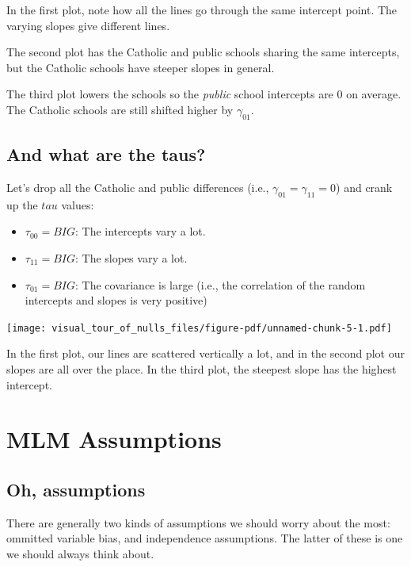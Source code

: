 \documentclass[
  letterpaper,
  DIV=11,
  numbers=noendperiod]{scrreprt}
\providecommand{\tightlist}{%
  \setlength{\itemsep}{0pt}\setlength{\parskip}{0pt}}\usepackage{longtable,booktabs,array}
\begin{document}
In the first plot, note how all the lines go through the same intercept
point. The varying slopes give different lines.

The second plot has the Catholic and public schools sharing the same
intercepts, but the Catholic schools have steeper slopes in general.

The third plot lowers the schools so the \emph{public} school intercepts
are 0 on average. The Catholic schools are still shifted higher by
\(\gamma_{01}\).

\section{And what are the taus?}\label{and-what-are-the-taus}

Let's drop all the Catholic and public differences (i.e.,
\(\gamma_{01} = \gamma_{11} = 0\)) and crank up the \(tau\) values:

\begin{itemize}
\tightlist
\item
  \(\tau_{00} = BIG\): The intercepts vary a lot.
\item
  \(\tau_{11} = BIG\): The slopes vary a lot.
\item
  \(\tau_{01} = BIG\): The covariance is large (i.e., the correlation of
  the random intercepts and slopes is very positive)
\end{itemize}

\begin{center}
\texttt{[image: visual\_tour\_of\_nulls\_files/figure-pdf/unnamed-chunk-5-1.pdf]}
\end{center}

In the first plot, our lines are scattered vertically a lot, and in the
second plot our slopes are all over the place. In the third plot, the
steepest slope has the highest intercept.

\chapter{MLM Assumptions}\label{mlm-assumptions}

\section{Oh, assumptions}\label{oh-assumptions}

There are generally two kinds of assumptions we should worry about the
most: ommitted variable bias, and independence assumptions. The latter
of these is one we should always think about.
\end{document}
